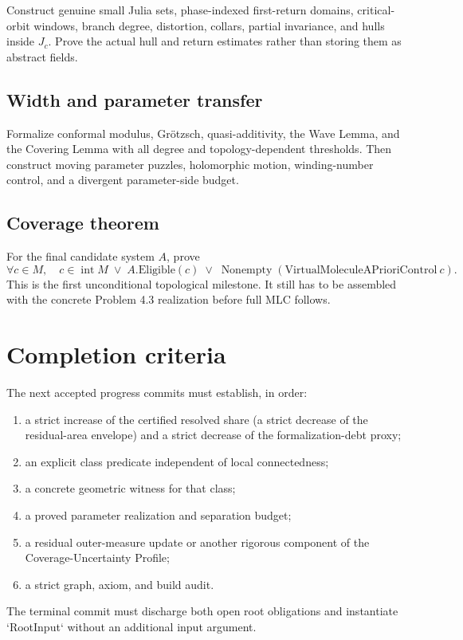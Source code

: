 \documentclass[11pt,a4paper]{article}
\begin{document}
Construct genuine small Julia sets, phase-indexed first-return domains,
critical-orbit windows, branch degree, distortion, collars, partial
invariance, and hulls inside \(J_c\). Prove the actual hull and return
estimates rather than storing them as abstract fields.

\subsection{Width and parameter transfer}

Formalize conformal modulus, Gr\"otzsch, quasi-additivity, the Wave Lemma,
and the Covering Lemma with all degree and topology-dependent thresholds.
Then construct moving parameter puzzles, holomorphic motion, winding-number
control, and a divergent parameter-side budget.

\subsection{Coverage theorem}

For the final candidate system \(A\), prove
\[
  \forall c\in M,\quad
  c\in\operatorname{int}M
  \;\lor\;
  A.\mathrm{Eligible}(c)
  \;\lor\;
  \operatorname{Nonempty}
  (\mathrm{VirtualMoleculeAPrioriControl}\ c).
\]
This is the first unconditional topological milestone. It still has to be
assembled with the concrete Problem 4.3 realization before full MLC follows.

\section{Completion criteria}

The next accepted progress commits must establish, in order:

\begin{enumerate}
  \item a strict increase of the certified resolved share (a strict decrease
        of the residual-area envelope) and a strict decrease of the
        formalization-debt proxy;
  \item an explicit class predicate independent of local connectedness;
  \item a concrete geometric witness for that class;
  \item a proved parameter realization and separation budget;
  \item a residual outer-measure update or another rigorous component of the
        Coverage-Uncertainty Profile;
  \item a strict graph, axiom, and build audit.
\end{enumerate}

The terminal commit must discharge both open root obligations and instantiate
`RootInput` without an additional input argument.
\end{document}
